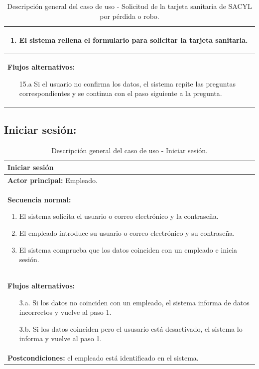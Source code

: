 \documentclass[12pt, a4paper, twoside]{report}
\begin{document}
\begin{table}[H]
\begin{tabular}{|p{16cm}|}
\begin{enumerate}
                    \item El sistema rellena el formulario para solicitar la tarjeta sanitaria.
                \end{enumerate} \\ \hline
            \textbf{Flujos alternativos:} 
                \begin{enumerate}
                    \item[15.a] Si el usuario no confirma los datos, el sistema repite las preguntas correspondientes y se continua con el paso siguiente a la pregunta.
                \end{enumerate} \\ \hline
            \end{tabular}
            \caption{Descripción general del caso de uso - Solicitud de la tarjeta sanitaria de SACYL por pérdida o robo.}
            \end{table}

        \subsection{Iniciar sesión:}
        \label{subsec:2.4.5.}
            \begin{table}[H]
            \centering
            \begin{tabular}{|p{16cm}|} 
            \hline
            \textbf{Iniciar sesión} \\ \hline
            \textbf{Actor principal:} Empleado. \\ \hline
            \textbf{Secuencia normal:}
                \begin{enumerate}
                    \item El sistema solicita el usuario o correo electrónico y la contraseña.
                    \item El empleado introduce su usuario o correo electrónico y su contraseña.
                    \item El sistema comprueba que los datos coinciden con un empleado e inicia sesión.
                \end{enumerate} \\ \hline
            \textbf{Flujos alternativos:}
                \begin{enumerate}
                    \item[3.a.] Si los datos no coinciden con un empleado, el sistema informa de datos incorrectos y vuelve al paso 1.
                    \item[3.b.] Si los datos coinciden pero el ususario está desactivado, el sistema lo informa y vuelve al paso 1.
                \end{enumerate} \\ \hline
            \textbf{Postcondiciones:} el empleado está identificado en el sistema. \\ \hline
            \end{tabular}
            \caption{Descripción general del caso de uso - Iniciar sesión.}
            \end{table}
\end{document}
